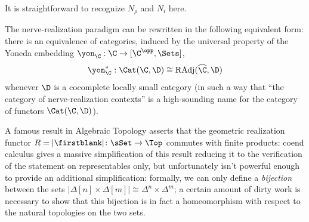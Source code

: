 It is straightforward to recognize $N_\rho$ and $N_i$ here.
\begin{remark}
The nerve\hyp{}realization paradigm can be rewritten in the following equivalent form: there is an equivalence of categories, induced by the universal property of the Yoneda embedding $\yon_\C : \C \to [\C^\opp,\Sets]$, 
\[
\yon_\C^* : \Cat(\C, \D)\cong \text{RAdj}(\widehat{\C}, \D)
\]
whenever $\D$ is a cocomplete locally small category (in such a way that ``the category of nerve\hyp{}realization contexts'' is a high-sounding name for the category of functors $\Cat(\C, \D)$).
\end{remark}
A famous result in Algebraic Topology \cite{GZ, GoJ} asserts that the geometric realization functor $R=|\firstblank| \colon \sSet\to\Top $ commutes with finite products: coend calculus gives a massive simplification of this result reducing it to the verification of the statement on representables only, but unfortunately
isn't powerful enough to provide an additional simplification: formally, we can only define a \emph{bijection} between the sets $|\Delta[n]\times \Delta[m]|\cong \Delta^n \times \Delta^m$; a certain amount of dirty work is necessary to show that this bijection is in fact a homeomorphism with respect to the natural topologies on the two sets. 
